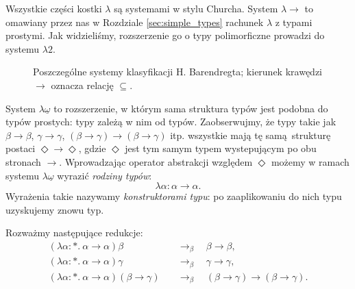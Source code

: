Wszystkie części kostki \(\lambda\) są systemami w stylu Churcha. System \(\lambda{\to}\) to omawiany przez nas w Rozdziale \ref{sec:simple_types} rachunek \(\lambda\) z typami prostymi. Jak widzieliśmy, rozszerzenie go o typy polimorficzne prowadzi do systemu \(\lambda 2\). 

\begin{figure}
  \centering
  \caption{Poszczególne systemy klasyfikacji H. Barendregta; kierunek krawędzi \(\to\)  oznacza relację \(\subseteq\).}\label{fig:lambda-cube}
\end{figure}

System    \(\lambda{\underline{\omega}}\)   to    rozszerzenie,   w
którym   sama   struktura   typów    jest   podobna   do   typów
prostych:   typy   zależą   w  nim   od   typów.   Zaobserwujmy,
że   typy   takie  jak   \(\beta\to\beta\),   \(\gamma\to\gamma\),
\((\beta\to\gamma)\to(\beta\to\gamma)\)   itp.    wszystkie   mają
tę  samą strukturę  postaci   \(\Diamond\to  \Diamond\),  gdzie
\(\Diamond\)  jest tym  samym typem  wystepującym po  obu stronach
\(\to\). Wprowadzając  operator abstrakcji  względem \(\Diamond\)
możemy w  ramach systemu  \(\lambda{\underline{\omega}}\) wyrazić
\emph{rodziny typów}:
\[
  \lambda \alpha: \alpha\to\alpha.
\]
Wyrażenia takie nazywamy \emph{konstruktorami typu}: po zaaplikowaniu do nich typu uzyskujemy znowu typ.
\begin{przyklad}
  Rozważmy następujące redukcje:
  \begin{align*}
    (\lambda \alpha : *.\ \alpha\to\alpha)\beta &\quad\to_\beta\quad \beta\to\beta,\\  
    (\lambda \alpha : *.\ \alpha\to\alpha)\gamma &\quad\to_\beta\quad \gamma\to\gamma,\\
    (\lambda \alpha : *.\ \alpha\to\alpha)(\beta\to\gamma) &\quad\to_\beta\quad (\beta\to\gamma)\to(\beta\to\gamma).
  \end{align*}
\end{przyklad}

